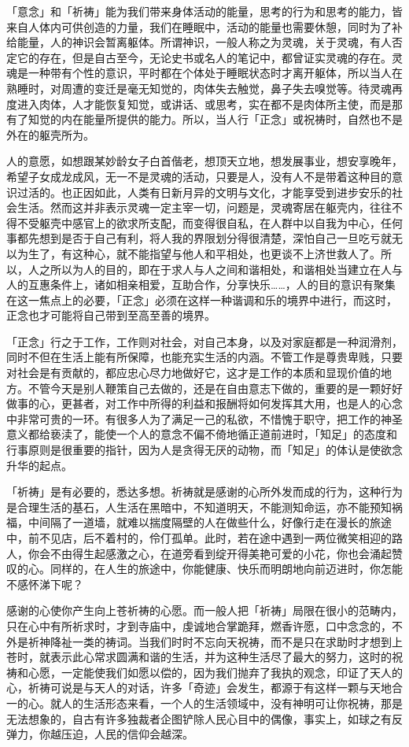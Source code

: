 \documentclass[12pt,twoside,openany]{book}
\begin{document}
「意念」和「祈祷」能为我们带来身体活动的能量，思考的行为和思考的能力，皆来自人体内可供创造的力量，我们在睡眠中，活动的能量也需要休憩，同时为了补给能量，人的神识会暂离躯体。所谓神识，一般人称之为灵魂，关于灵魂，有人否定它的存在，但是自古至今，无论史书或名人的笔记中，都曾证实灵魂的存在。灵魂是一种带有个性的意识，平时都在个体处于睡眠状态时才离开躯体，所以当人在熟睡时，对周遭的变迁是毫无知觉的，肉体失去触觉，鼻子失去嗅觉等。待灵魂再度进入肉体，人才能恢复知觉，或讲话、或思考，实在都不是肉体所主使，而是那有了知觉的内在能量所提供的能力。所以，当人行「正念」或祝祷时，自然也不是外在的躯壳所为。

人的意愿，如想跟某妙龄女子白首偕老，想顶天立地，想发展事业，想安享晚年，希望子女成龙成风，无一不是灵魂的活动，只要是人，没有人不是带着这种目的意识过活的。也正因如此，人类有日新月异的文明与文化，才能享受到进步安乐的社会生活。然而这并非表示灵魂一定主宰一切，问题是，灵魂寄居在躯壳内，往往不得不受躯壳中感官上的欲求所支配，而变得很自私，在人群中以自我为中心，任何事都先想到是否于自己有利，将人我的界限划分得很清楚，深怕自己一旦吃亏就无以为生了，有这种心，就不能指望与他人和平相处，也更谈不上济世救人了。所以，人之所以为人的目的，即在于求人与人之间和谐相处，和谐相处当建立在人与人的互惠条件上，诸如相亲相爱，互助合作，分享快乐……，人的目的意识有聚集在这一焦点上的必要，「正念」必须在这样一种谐调和乐的境界中进行，而这时，正念也才可能将自己带到至高至善的境界。

「正念」行之于工作，工作则对社会，对自己本身，以及对家庭都是一种润滑剂，同时不但在生活上能有所保障，也能充实生活的内涵。不管工作是尊贵卑贱，只要对社会是有贡献的，都应忠心尽力地做好它，这才是工作的本质和显现价值的地方。不管今天是别人鞭策自己去做的，还是在自由意志下做的，重要的是一颗好好做事的心，更甚者，对工作中所得的利益和报酬将如何发挥其大用，也是人的心念中非常可贵的一环。有很多人为了满足一己的私欲，不惜愧于职守，把工作的神圣意义都给亵渎了，能使一个人的意念不偏不倚地循正道前进时，「知足」的态度和行事原则是很重要的指针，因为人是贪得无厌的动物，而「知足」的体认是使欲念升华的起点。

「祈祷」是有必要的，悉达多想。祈祷就是感谢的心所外发而成的行为，这种行为是合理生活的基石，人生活在黑暗中，不知道明天，不能测知命运，亦不能预知祸福，中间隔了一道墙，就难以揣度隔壁的人在做些什么，好像行走在漫长的旅途中，前不见店，后不着村的，伶仃孤单。此时，若在途中遇到一两位微笑相迎的路人，你会不由得生起感激之心，在道旁看到绽开得美艳可爱的小花，你也会涌起赞叹的心。同样的，在人生的旅途中，你能健康、快乐而明朗地向前迈进时，你怎能不感怀涕下呢？

感谢的心使你产生向上苍祈祷的心愿。而一般人把「祈祷」局限在很小的范畴内，只在心中有所祈求时，才到寺庙中，虔诚地合掌跪拜，燃香许愿，口中念念的，不外是祈神降祉一类的祷词。当我们时时不忘向天祝祷，而不是只在求助时才想到上苍时，就表示此心常求圆满和谐的生活，并为这种生活尽了最大的努力，这时的祝祷和心愿，一定能使我们如愿以偿的，因为我们抛弃了我执的观念，印证了天人的心，祈祷可说是与天人的对话，许多「奇迹」会发生，都源于有这样一颗与天地合一的心。就人的生活形态来看，一个人的生活领域中，没有神明可让你祝祷，那是无法想象的，自古有许多独裁者企图铲除人民心目中的偶像，事实上，如球之有反弹力，你越压迫，人民的信仰会越深。
\end{document}
